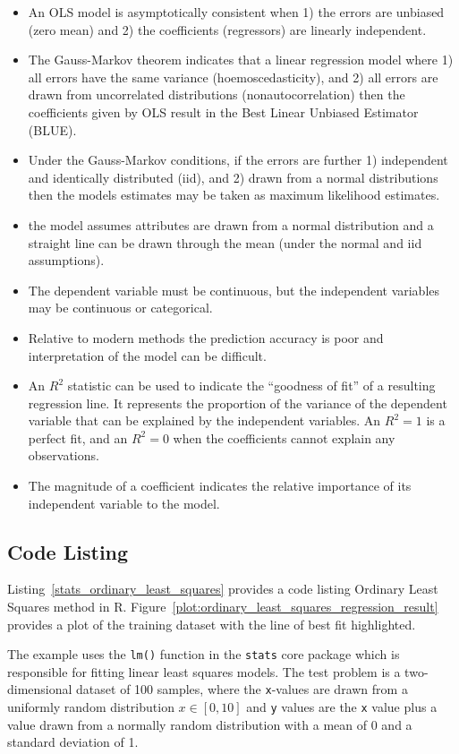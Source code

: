 \begin{itemize}
	\item An OLS model is asymptotically consistent when 1) the errors are unbiased (zero mean) and 2) the coefficients (regressors) are linearly independent.
	\item The Gauss-Markov theorem indicates that a linear regression model where 1) all errors have the same variance (hoemoscedasticity), and 2) all errors are drawn from uncorrelated distributions (nonautocorrelation) then the coefficients given by OLS result in the Best Linear Unbiased Estimator (BLUE).
	\item Under the Gauss-Markov conditions, if the errors are further 1) independent and identically distributed (iid), and 2) drawn from a normal distributions then the models estimates may be taken as maximum likelihood estimates.
	\item the model assumes attributes are drawn from a normal distribution and a straight line can be drawn through the mean (under the normal and iid assumptions).
	\item The dependent variable must be continuous, but the independent variables may be continuous or categorical.
	\item Relative to modern methods the prediction accuracy is poor and interpretation of the model can be difficult.
	\item An $R^2$ statistic can be used to indicate the ``goodness of fit'' of a resulting regression line. It represents the proportion of the variance of the dependent variable that can be explained by the independent variables. An $R^2=1$ is a perfect fit, and an $R^2=0$ when the coefficients cannot explain any observations.
	\item The magnitude of a coefficient indicates the relative importance of its independent variable to the model.
\end{itemize}


\subsection{Code Listing}
Listing~\ref{stats_ordinary_least_squares} provides a code listing Ordinary Least Squares method in R. Figure~\ref{plot:ordinary_least_squares_regression_result} provides a plot of the training dataset with the line of best fit highlighted.

The example uses the \texttt{lm()} function in the \texttt{stats} core package which is responsible for fitting linear least squares models.
The test problem is a two-dimensional dataset of 100 samples, where the \texttt{x}-values are drawn from a uniformly random distribution $x \in [0,10]$ and \texttt{y} values are the \texttt{x} value plus a value drawn from a normally random distribution with a mean of 0 and a standard deviation of 1.

